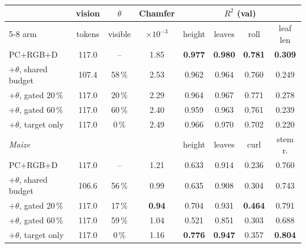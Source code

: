 \begin{table}[t]
  \centering\scriptsize
  \setlength{\tabcolsep}{3.2pt}
  \begin{tabular}{l cc c cccc}
    \toprule
    & vision & $\theta$ & Chamfer & \multicolumn{4}{c}{$R^2$ (val)} \\
    \cmidrule(lr){5-8}
    arm & tokens & visible & $\times10^{-3}$ & height & leaves & roll & leaf len \\
    \midrule
    PC+RGB+D                      & 117.0 & --      & 1.85 & \textbf{0.977} & \textbf{0.980} & \textbf{0.781} & \textbf{0.309} \\
    $+\theta$, shared budget      & 107.4 & 58\,\%  & 2.53 & 0.962 & 0.964 & 0.760 & 0.249 \\
    $+\theta$, gated 20\,\%       & 117.0 & 20\,\%  & 2.29 & 0.964 & 0.967 & 0.771 & 0.278 \\
    $+\theta$, gated 60\,\%       & 117.0 & 60\,\%  & 2.40 & 0.959 & 0.963 & 0.761 & 0.239 \\
    $+\theta$, target only        & 117.0 & 0\,\%   & 2.49 & 0.966 & 0.970 & 0.702 & 0.220 \\
    \midrule
    \multicolumn{4}{l}{\emph{Maize}} & height & leaves & curl & stem r. \\
    PC+RGB+D                      & 117.0 & --      & 1.21 & 0.633 & 0.914 & 0.236 & 0.760 \\
    $+\theta$, shared budget      & 106.6 & 56\,\%  & 0.99 & 0.635 & 0.908 & 0.304 & 0.743 \\
    $+\theta$, gated 20\,\%       & 117.0 & 17\,\%  & \textbf{0.94} & 0.704 & 0.931 & \textbf{0.464} & 0.791 \\
    $+\theta$, gated 60\,\%       & 117.0 & 59\,\%  & 1.04 & 0.521 & 0.851 & 0.303 & 0.688 \\
    $+\theta$, target only        & 117.0 & 0\,\%   & 1.16 & \textbf{0.776} & \textbf{0.947} & 0.357 & \textbf{0.804} \\
    \bottomrule
  \end{tabular}

\end{table}
